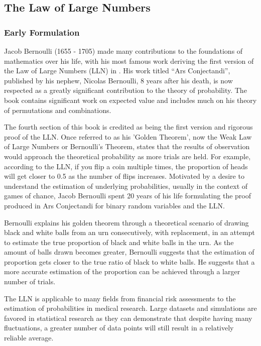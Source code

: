 
\subsection{The Law of Large Numbers}


\subsubsection{Early Formulation}
Jacob Bernoulli (1655 - 1705) made many contributions to the foundations of mathematics over his life, with his most famous work deriving the first version of the Law of Large Numbers (LLN) in \cite{Bernoulli1713}. His work titled ``Ars Conjectandi'', published by his nephew, Nicolas Bernoulli, 8 years after his death, is now respected as a greatly significant contribution to the theory of probability. The book contains significant work on expected value and includes much on his theory of permutations and combinations.

The fourth section of this book is credited as being the first version and rigorous proof of the LLN. Once referred to as his 'Golden Theorem', now the Weak Law of Large Numbers or Bernoulli's Theorem, states that the results of observation would approach the theoretical probability as more trials are held. For example, according to the LLN, if you flip a coin multiple times, the proportion of heads will get closer to 0.5 as the number of flips increases. Motivated by a desire to understand the estimation of underlying probabilities, usually in the context of games of chance, Jacob Bernoulli spent 20 years of his life formulating the proof produced in Ars Conjectandi for binary random variables and the LLN. 

Bernoulli explains his golden theorem through a theoretical scenario of drawing black and white balls from an urn consecutively, with replacement, in an attempt to estimate the true proportion of black and white balls in the urn. As the amount of balls drawn becomes greater, Bernoulli suggests that the estimation of proportion gets closer to the true ratio of black to white balls. He suggests that a more accurate estimation of the proportion can be achieved through a larger number of trials.

The LLN is applicable to many fields from financial risk assessments to the estimation of probabilities in medical research. Large datasets and simulations are favored in statistical research as they can demonstrate that despite having many fluctuations, a greater number of data points will still result in a relatively reliable average.

